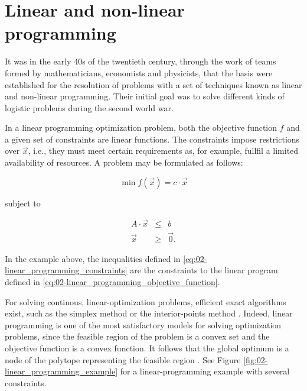 \section{Linear and non-linear programming}

It was in the early 40s of the twentieth century, through the work
of teams formed by mathematicians, economists and physicists, that
the basis were established for the resolution of problems with a set
of techniques known as linear and non-linear programming. Their initial
goal was to solve different kinds of logistic problems during the
second world war.

In a linear programming optimization problem, both the objective function
$f$ and a given set of constraints are linear functions. The constraints
impose restrictions over $\vec{x}$, i.e., they must meet certain
requirements as, for example, fullfil a limited availability of resources.
A problem may be formulated as follows:

\begin{equation}
\min f(\vec{x})=c\cdot\vec{x}\label{eq:02-linear_programming_objective_function}
\end{equation}


\noindent subject to

\begin{eqnarray}
A\cdot\vec{x} & \le & b\nonumber \\
\vec{x} & \ge & \vec{0}.\label{eq:02-linear_programming_constraints}
\end{eqnarray}


\noindent In the example above, the inequalities defined in \ref{eq:02-linear_programming_constraints}
are the constraints to the linear program defined in \ref{eq:02-linear_programming_objective_function}.

For solving continous, linear-optimization problems, efficient exact
algorithms exist, such as the simplex method \cite{Dantzig-Maximization_of_a_linear_function_of_variables_subject_to_linear_inequalities:1951}
or the interior-points method \cite{Karmarkar-A_new_polynomial_time_algorithm_for_linear_programming:1984}.
Indeed, linear programming is one of the most satisfactory models
for solving optimization problems, since the feasible region of the
problem is a convex set and the objective function is a convex function.
It follows that the global optimum is a node of the polytope representing
the feasible region \cite{Talbi_Metaheuristics:2009}. See Figure
\ref{fig:02-linear_programming_example} for a linear-programming
example with several constraints.

